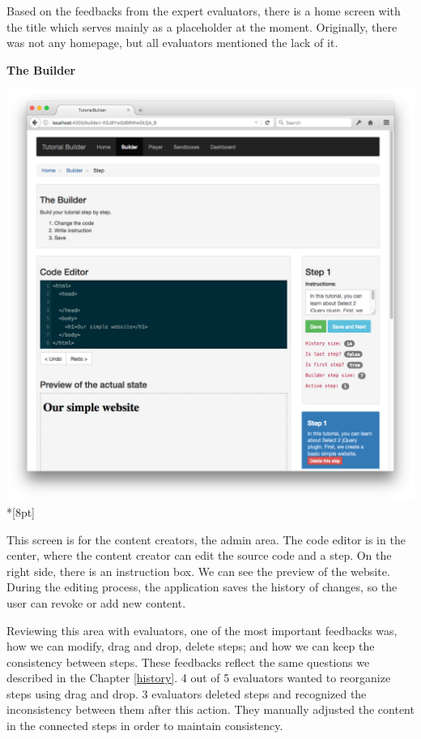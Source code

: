 \documentclass[11pt, a4paper, oneside, openright, medskipamount]{report}
\begin{document}
Based on the feedbacks from the expert evaluators, there is a home screen with the title which serves mainly as a placeholder at the moment. Originally, there was not any homepage, but all evaluators mentioned the lack of it.

\newpage

\textbf{The Builder}

\includegraphics[width=1\textwidth]{assets/tour-screenshots/the-builder.png}\\*[8pt]

This screen is for the content creators, the admin area. The code editor is in the center, where the content creator can edit the source code and a step. On the right side, there is an instruction box. We can see the preview of the website. During the editing process, the application saves the history of changes, so the user can revoke or add new content.

Reviewing this area with evaluators, one of the most important feedbacks was, how we can modify, drag and drop, delete steps; and how we can keep the consistency between steps. These feedbacks reflect the same questions we described in the Chapter \ref{history}. 4 out of 5 evaluators wanted to reorganize steps using drag and drop. 3 evaluators deleted steps and recognized the inconsistency between them  after this action. They manually adjusted the content in the connected steps in order to maintain consistency.
\end{document}
